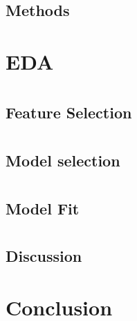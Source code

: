 \documentclass[12pt,twoside]{reedthesis}
\theoremstyle{definition}
\theoremstyle{definition}
\theoremstyle{definition}
\theoremstyle{remark}
\begin{document}
\section{Methods}\label{methods}

\chapter{EDA}\label{eda}

\chapter{}\label{section-2}

\section{Feature Selection}\label{feature-selection}

\chapter{}\label{section-3}

\section{Model selection}\label{model-selection}

\chapter{}\label{section-4}

\section{Model Fit}\label{model-fit}

\chapter{}\label{section-5}

\section{Discussion}\label{discussion}

\chapter*{Conclusion}\label{conclusion}
\end{document}
